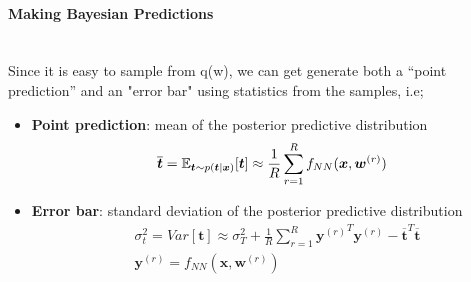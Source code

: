 \documentclass[main]{subfiles}
\begin{document}
\paragraph{Making Bayesian Predictions}\mbox{} \\

\noindent Since it is easy to sample from q(w), we can get generate both a “point prediction” and an "error bar" using statistics from the samples, i.e;
\begin{itemize}
    \item \textbf{Point prediction}: mean of the posterior predictive distribution
    \begin{equation}
        \overline{\bm{t}} = \operatorname{\mathbb{E}}_{\bm{t}\sim p(\bm{t}|\bm{x})}[\bm{t}] \approx \frac{1}{R} \sum_{r=1}^{R} f_{NN}(\bm{x}, \bm{w}^{(r)})
    \end{equation}
    \item \textbf{Error bar}: standard deviation of the posterior predictive distribution
    \begin{equation}
        \begin{split}
            &\sigma^2_t = Var[\bm{t}] \approx \sigma^2_T + \frac{1}{R} \sum_{r=1}^{R}{\bm{y}^{(r)}}^T  \bm{y}^{(r)} - {\overline{\bm{t}}}^T  \overline{\bm{t}}\\
            &\bm{y}^{(r)} = f_{NN} (\bm{x}, \bm{w}^{(r)})
        \end{split}
    \end{equation}
\end{itemize}
\end{document}
